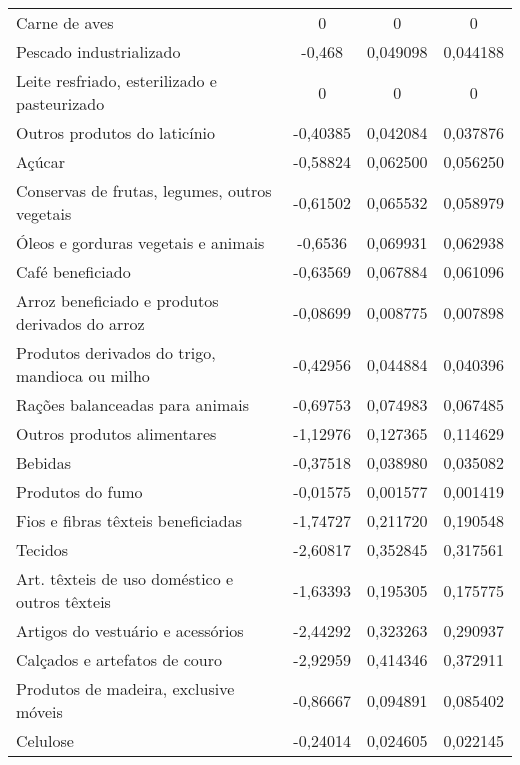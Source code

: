 \begin{apendicesenv}
\begin{small}
\begin{center}
\begin{longtable}{m{8cm}ccc}
				Carne de aves                                      & 0 & 0 & 0 \\
				Pescado industrializado                            & -0,468 & 0,049098 & 0,044188 \\
				Leite resfriado, esterilizado   e pasteurizado     & 0 & 0 & 0 \\
				Outros produtos do laticínio                       & -0,40385 & 0,042084 & 0,037876 \\
				Açúcar                                             & -0,58824 & 0,062500 & 0,056250 \\
				Conservas de frutas, legumes, outros vegetais      & -0,61502 & 0,065532 & 0,058979 \\
				Óleos e gorduras vegetais e animais                & -0,6536 & 0,069931 & 0,062938 \\
				Café beneficiado                                   & -0,63569 & 0,067884 & 0,061096 \\
				Arroz beneficiado e produtos derivados do arroz    & -0,08699 & 0,008775 & 0,007898 \\
				Produtos derivados do trigo, mandioca ou milho     & -0,42956 & 0,044884 & 0,040396 \\
				Rações balanceadas para animais                    & -0,69753 & 0,074983 & 0,067485 \\
				Outros produtos alimentares                        & -1,12976 & 0,127365 & 0,114629 \\
				Bebidas                                            & -0,37518 & 0,038980 & 0,035082 \\
				Produtos do fumo                                   & -0,01575 & 0,001577 & 0,001419 \\
				Fios e fibras têxteis   beneficiadas               & -1,74727 & 0,211720 & 0,190548 \\
				Tecidos                                            & -2,60817 & 0,352845 & 0,317561 \\
				Art. têxteis de uso doméstico   e outros têxteis   & -1,63393 & 0,195305 & 0,175775 \\
				Artigos do vestuário e acessórios                  & -2,44292 & 0,323263 & 0,290937 \\
				Calçados e artefatos de couro                      & -2,92959 & 0,414346 & 0,372911 \\
				Produtos de madeira, exclusive móveis              & -0,86667 & 0,094891 & 0,085402 \\
				Celulose                                           & -0,24014 & 0,024605 & 0,022145 \\

\end{longtable}
\end{center}
\end{small}
\end{apendicesenv}
